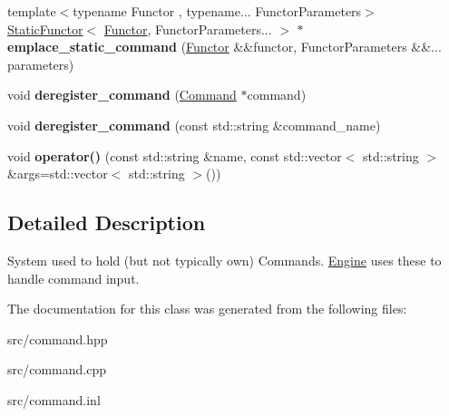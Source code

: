 \begin{DoxyCompactItemize}
\item 
\mbox{\label{class_command_executor_a745e9fc9e15db7102e50b3b23370fc3d}} 
{\footnotesize template$<$typename Functor , typename... Functor\+Parameters$>$ }\\\mbox{\hyperlink{class_static_functor}{Static\+Functor}}$<$ \mbox{\hyperlink{class_functor}{Functor}}, Functor\+Parameters... $>$ $\ast$ {\bfseries emplace\+\_\+static\+\_\+command} (\mbox{\hyperlink{class_functor}{Functor}} \&\&functor, Functor\+Parameters \&\&... parameters)
\item 
\mbox{\label{class_command_executor_a6f99990af551c26ced617d0c58720c74}} 
void {\bfseries deregister\+\_\+command} (\mbox{\hyperlink{class_command}{Command}} $\ast$command)
\item 
\mbox{\label{class_command_executor_ae4af9df5bdf49a97f3efaf483f53c97b}} 
void {\bfseries deregister\+\_\+command} (const std\+::string \&command\+\_\+name)
\item 
\mbox{\label{class_command_executor_a1076730c7e82e790ed11566677883b5e}} 
void {\bfseries operator()} (const std\+::string \&name, const std\+::vector$<$ std\+::string $>$ \&args=std\+::vector$<$ std\+::string $>$())
\end{DoxyCompactItemize}


\subsection{Detailed Description}
System used to hold (but not typically own) Commands. \mbox{\hyperlink{class_engine}{Engine}} uses these to handle command input. 

The documentation for this class was generated from the following files\+:\begin{DoxyCompactItemize}
\item 
src/command.\+hpp\item 
src/command.\+cpp\item 
src/command.\+inl\end{DoxyCompactItemize}
